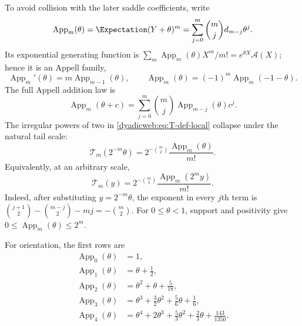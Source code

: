 \documentclass[11pt,oneside]{article}
\theoremstyle{definition}
\theoremstyle{remark}
\begin{document}
To avoid collision with the later saddle coefficients, write
\begin{equation}
 \operatorname{App}_m(\theta)=\Expectation(Y+\theta)^m
 =\sum_{j=0}^{m}\binom mjd_{m-j}\theta^j.
 \label{dyadicweb:eq:Appell-definition}
\end{equation}
Its exponential generating function is
$\sum_m\operatorname{App}_m(\theta)X^m/m!=e^{\theta X}\mathscr A(X)$;
hence it is an Appell family,
\begin{equation}
 \operatorname{App}_m'(\theta)=m\operatorname{App}_{m-1}(\theta),\qquad
 \operatorname{App}_m(\theta)=(-1)^m\operatorname{App}_m(-1-\theta).
 \label{dyadicweb:eq:Appell-identities}
\end{equation}
The full Appell addition law is
\begin{equation}
 \operatorname{App}_m(\theta+c)
 =\sum_{j=0}^{m}\binom mj\operatorname{App}_{m-j}(\theta)c^j.
 \label{dyadicq:eq:Appell-addition}
\end{equation}
The irregular powers of two in \eqref{dyadicweb:eq:T-def-local} collapse under the natural
tail scale:
\begin{equation}
 \boxed{
 \mathcal T_m(2^{-m}\theta)
 =2^{-\binom m2}\frac{\operatorname{App}_m(\theta)}{m!}.}
 \label{dyadicweb:eq:Appell-compression}
\end{equation}
Equivalently, at an arbitrary scale,
\begin{equation}
 \mathcal T_m(y)=2^{-\binom m2}
 \frac{\operatorname{App}_m(2^my)}{m!}.                  \label{dyadicq:eq:R-Appell-general}
\end{equation}
Indeed, after substituting $y=2^{-m}\theta$, the exponent in every $j$th term is
$\binom{j+1}{2}-\binom{m-j}{2}-mj=-\binom m2$.
For $0\le\theta<1$, support and positivity give
$0\le\operatorname{App}_m(\theta)\le2^m$.

For orientation, the first rows are
\begin{align*}
 \operatorname{App}_0(\theta)&=1,\\
 \operatorname{App}_1(\theta)&=\theta+\frac12,\\
 \operatorname{App}_2(\theta)&=\theta^2+\theta+\frac5{18},\\
 \operatorname{App}_3(\theta)&=\theta^3+\frac32\theta^2+\frac56\theta+\frac16,\\
 \operatorname{App}_4(\theta)&=\theta^4+2\theta^3+\frac53\theta^2
              +\frac23\theta+\frac{143}{1350}.
\end{align*}
\end{document}
